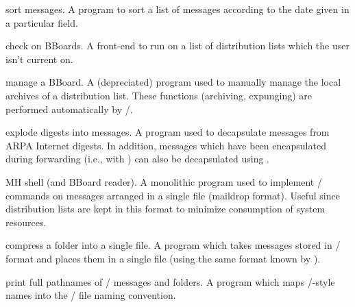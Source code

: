  sort messages.
A program to sort a list of messages according to the date given in a
particular field.

 check on BBoards.
A front-end to run  on a list of distribution lists which the
user isn't current on.

 manage a BBoard.
A (depreciated) program used to manually manage the local archives of a
distribution list.
These functions (archiving, expunging) are performed automatically by \MH/.

 explode digests into messages.
A program used to decapsulate messages from ARPA Internet digests.
In addition,
messages which have been encapsulated during forwarding
(i.e., with )
can also be decapsulated using .%

 MH shell (and BBoard reader).
A monolithic program used to implement \MH/ commands on
messages arranged in a single file (maildrop format).
Useful
since distribution lists are kept in this format to minimize consumption of
system resources.

 compress a folder into a single file.
A program which takes messages stored in \MH/ format and places them in a
single file (using the same format known by ).

 print full pathnames of \MH/ messages and folders.
A program which maps \MH/-style names into the \unix/ file naming convention.

